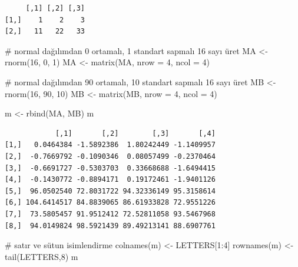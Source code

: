 \documentclass[
  letterpaper,
  DIV=11,
  numbers=noendperiod]{scrreprt}
\newenvironment{Shaded}{\begin{snugshade}}{\end{snugshade}}
\newcommand{\AttributeTok}[1]{\textcolor[rgb]{0.40,0.45,0.13}{#1}}
\newcommand{\CommentTok}[1]{\textcolor[rgb]{0.37,0.37,0.37}{#1}}
\newcommand{\DecValTok}[1]{\textcolor[rgb]{0.68,0.00,0.00}{#1}}
\newcommand{\FunctionTok}[1]{\textcolor[rgb]{0.28,0.35,0.67}{#1}}
\newcommand{\NormalTok}[1]{\textcolor[rgb]{0.00,0.23,0.31}{#1}}
\newcommand{\OtherTok}[1]{\textcolor[rgb]{0.00,0.23,0.31}{#1}}
\newcommand{\SpecialCharTok}[1]{\textcolor[rgb]{0.37,0.37,0.37}{#1}}
\begin{document}
\begin{verbatim}
     [,1] [,2] [,3]
[1,]    1    2    3
[2,]   11   22   33
\end{verbatim}

\begin{Shaded}
\begin{Highlighting}[]
\CommentTok{\# normal dağılımdan 0 ortamalı, 1 standart sapmalı 16 sayı üret}
\NormalTok{MA }\OtherTok{\textless{}{-}} \FunctionTok{rnorm}\NormalTok{(}\DecValTok{16}\NormalTok{, }\DecValTok{0}\NormalTok{, }\DecValTok{1}\NormalTok{)}
\NormalTok{MA }\OtherTok{\textless{}{-}} \FunctionTok{matrix}\NormalTok{(MA, }\AttributeTok{nrow =} \DecValTok{4}\NormalTok{, }\AttributeTok{ncol =} \DecValTok{4}\NormalTok{)}

\CommentTok{\# normal dağılımdan 90 ortamalı, 10 standart sapmalı 16 sayı üret}
\NormalTok{MB }\OtherTok{\textless{}{-}} \FunctionTok{rnorm}\NormalTok{(}\DecValTok{16}\NormalTok{, }\DecValTok{90}\NormalTok{, }\DecValTok{10}\NormalTok{)}
\NormalTok{MB }\OtherTok{\textless{}{-}} \FunctionTok{matrix}\NormalTok{(MB, }\AttributeTok{nrow =} \DecValTok{4}\NormalTok{, }\AttributeTok{ncol =} \DecValTok{4}\NormalTok{)}

\NormalTok{m }\OtherTok{\textless{}{-}} \FunctionTok{rbind}\NormalTok{(MA, MB)}
\NormalTok{m}
\end{Highlighting}
\end{Shaded}

\begin{verbatim}
            [,1]       [,2]        [,3]       [,4]
[1,]   0.0464384 -1.5892386  1.80242449 -1.1409957
[2,]  -0.7669792 -0.1090346  0.08057499 -0.2370464
[3,]  -0.6691727 -0.5303703  0.33668688 -1.6494415
[4,]  -0.1430772 -0.8894171  0.19172461 -1.9401126
[5,]  96.0502540 72.8031722 94.32336149 95.3158614
[6,] 104.6414517 84.8839065 86.61933828 72.9551226
[7,]  73.5805457 91.9512412 72.52811058 93.5467968
[8,]  94.0149824 98.5921439 89.49213141 88.6907761
\end{verbatim}

\begin{Shaded}
\begin{Highlighting}[]
\CommentTok{\# satır ve sütun isimlendirme}
\FunctionTok{colnames}\NormalTok{(m) }\OtherTok{\textless{}{-}}\NormalTok{ LETTERS[}\DecValTok{1}\SpecialCharTok{:}\DecValTok{4}\NormalTok{]}
\FunctionTok{rownames}\NormalTok{(m) }\OtherTok{\textless{}{-}} \FunctionTok{tail}\NormalTok{(LETTERS,}\DecValTok{8}\NormalTok{)}
\NormalTok{m}
\end{Highlighting}
\end{Shaded}
\end{document}

